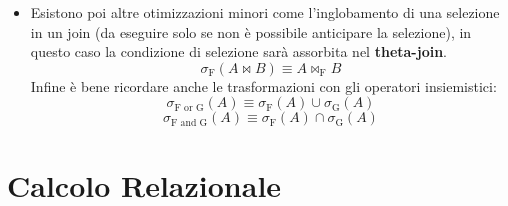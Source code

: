 \documentclass{report}
\begin{document}
\begin{itemize}
    \item Esistono poi altre otimizzazioni minori come l'inglobamento di una selezione in un join (da eseguire solo se non è possibile anticipare la selezione), in questo caso la condizione di selezione sarà assorbita nel \textbf{theta-join}.\\
$$\sigma_\text{F}(A \bowtie B) \equiv A \bowtie_\text{F} B$$
    Infine è bene ricordare anche le trasformazioni con gli operatori insiemistici:\\
$$\sigma_\text{F or G}(A) \equiv \sigma_\text{F}(A) \cup \sigma_\text{G}(A)$$
$$\sigma_\text{F and G}(A) \equiv \sigma_\text{F}(A) \cap \sigma_\text{G}(A)$$
    
\end{itemize}



\newpage
\chapter{Calcolo Relazionale}
\end{document}
